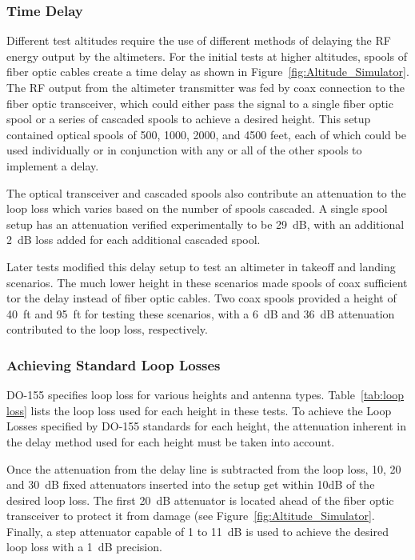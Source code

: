 \subsubsection{Time Delay}\label{subsub:delay}
Different test altitudes require the use of different methods of delaying the RF energy output by the altimeters. For the initial tests at higher altitudes, spools of fiber optic cables create a time delay as shown in Figure~\ref{fig:Altitude_Simulator}. The RF output from the altimeter transmitter was fed by coax connection to the fiber optic transceiver, which could either pass the signal to a single fiber optic spool or a series of cascaded spools to achieve a desired height. This setup contained optical spools of 500, 1000, 2000, and 4500 feet, each of which could be used individually or in conjunction with any or all of the other spools to implement a delay.

 The optical transceiver and cascaded spools also contribute an attenuation to the loop loss which varies based on the number of spools cascaded. A single spool setup has an attenuation verified experimentally to be 29~dB, with an additional 2~dB loss added for each additional cascaded spool.

Later tests modified this delay setup to test an altimeter in takeoff and landing scenarios. The much lower height in these scenarios made spools of coax sufficient tor the delay instead of fiber optic cables. Two coax spools provided a height of 40~ft and 95~ft for testing these scenarios, with a 6~dB and 36~dB attenuation contributed to the loop loss, respectively.  

\subsubsection{Achieving Standard Loop Losses}\label{subsub:loss}
DO-155 specifies loop loss for various heights and antenna types. Table~\ref{tab:loop loss} lists the loop loss used for each height in these tests. To achieve the Loop Losses specified by DO-155 standards for each height, the attenuation inherent in the delay method used for each height must be taken into account. 

Once the attenuation from the delay line is subtracted from the loop loss, 10, 20 and 30~dB fixed attenuators inserted into the setup get within 10dB of the desired loop loss. The first 20~dB attenuator is located ahead of the fiber optic transceiver to protect it from damage (see Figure~\ref{fig:Altitude_Simulator}.  Finally, a step attenuator capable of 1 to 11~dB is used to achieve the desired loop loss with a 1~dB precision. 

